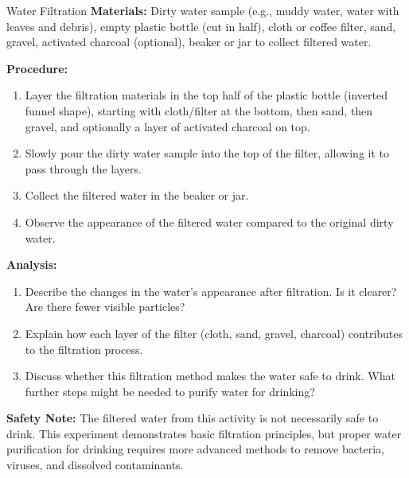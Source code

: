 \begin{investigation}{Water Filtration}
\textbf{Materials:}  Dirty water sample (e.g., muddy water, water with leaves and debris),  empty plastic bottle (cut in half),  cloth or coffee filter,  sand,  gravel,  activated charcoal (optional),  beaker or jar to collect filtered water.

\textbf{Procedure:}
\begin{enumerate}
    \item  Layer the filtration materials in the top half of the plastic bottle (inverted funnel shape), starting with cloth/filter at the bottom, then sand, then gravel, and optionally a layer of activated charcoal on top.
    \item  Slowly pour the dirty water sample into the top of the filter, allowing it to pass through the layers.
    \item  Collect the filtered water in the beaker or jar.
    \item  Observe the appearance of the filtered water compared to the original dirty water.
\end{enumerate}

\textbf{Analysis:}
\begin{enumerate}
    \item  Describe the changes in the water's appearance after filtration.  Is it clearer?  Are there fewer visible particles?
    \item  Explain how each layer of the filter (cloth, sand, gravel, charcoal) contributes to the filtration process.
    \item  Discuss whether this filtration method makes the water safe to drink.  What further steps might be needed to purify water for drinking?
\end{enumerate}
\textbf{Safety Note:}  The filtered water from this activity is not necessarily safe to drink.  This experiment demonstrates basic filtration principles, but proper water purification for drinking requires more advanced methods to remove bacteria, viruses, and dissolved contaminants.
\end{investigation}



